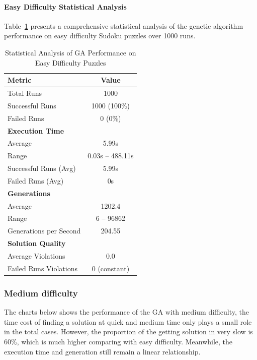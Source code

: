 \paragraph{Easy Difficulty Statistical Analysis}

Table~\ref{tab:easy_difficulty_stats} presents a comprehensive statistical analysis of the genetic algorithm performance on easy difficulty Sudoku puzzles over 1000 runs.

\begin{table}[H]
\centering
\caption{Statistical Analysis of GA Performance on Easy Difficulty Puzzles}
\label{tab:easy_difficulty_stats}
\begin{tabular}{@{}lc@{}}
\toprule
\textbf{Metric} & \textbf{Value} \\
\midrule
Total Runs & 1000 \\
Successful Runs & 1000 (100\%) \\
Failed Runs & 0 (0\%) \\
\midrule
\textbf{Execution Time} & \\
Average & 5.99s \\
Range & 0.03s -- 488.11s\\
Successful Runs (Avg) & 5.99s \\
Failed Runs (Avg) & 0s \\
\midrule
\textbf{Generations} & \\
Average & 1202.4 \\
Range & 6 -- 96862 \\
Generations per Second & 204.55 \\
\midrule
\textbf{Solution Quality} & \\
Average Violations & 0.0 \\
Failed Runs Violations & 0 (constant) \\
\bottomrule
\end{tabular}
\end{table}

\subsubsection{Medium difficulty}

The charts below shows the performance of the GA with medium difficulty, the time cost of finding a solution at quick and medium time only plays a small role in the total cases.
However, the proportion of the getting solution in very slow is $60\%$, which is much higher comparing with easy difficulty.
Meanwhile, the execution time and generation still remain a linear relationship.

